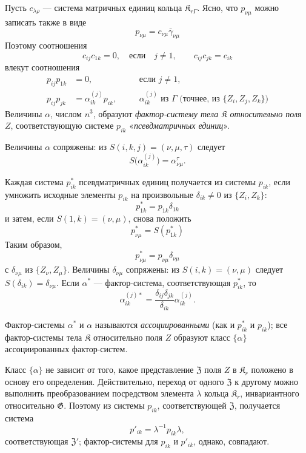 \documentclass[11pt]{article}
\begin{document}
Пусть \(c_{\lambda\rho}\) --- система матричных единиц кольца \(\mathfrak K_{r\Gamma}\). Ясно, что \(p_{\nu\mu}\) можно записать также в виде
\[
p_{\nu\mu}=c_{\nu\mu}\bar\gamma_{\nu\mu}
\]
Поэтому соотношения
\[
c_{ij}c_{1k}=0,\quad\text{если}\quad j\ne1,
\qquad
c_{ij}c_{jk}=c_{ik}
\]
влекут соотношения
\[
\begin{aligned}
p_{ij}p_{1k}&=0,\quad &&\text{если }j\ne1,\\
p_{ij}p_{jk}&=\alpha_{ik}^{(j)}p_{ik},\quad
&&\alpha_{ik}^{(j)}\text{ из }\Gamma\text{ (точнее, из }\{Z_i,Z_j,Z_k\}\text{)}
\end{aligned}
\]
Величины \(\alpha\), числом \(n^3\), образуют \emph{фактор-систему тела \(\mathfrak K\) относительно поля \(Z\)}, соответствующую системе \(p_{ik}\) «\emph{псевдматричных единиц}».

Величины \(\alpha\) сопряжены: из \(S(i,k,j)=(\nu,\mu,\tau)\) следует
\[
S\bigl(\alpha_{ik}^{(j)}\bigr)=\alpha_{\nu\mu}^{\tau}.
\]

Каждая система \(p_{ik}^*\) псевдматричных единиц получается из системы \(p_{ik}\), если умножить исходные элементы \(p_{ik}\) на произвольные \(\delta_{ik}\ne0\) из \(\{Z_i,Z_k\}\):
\[
p_{1k}^*=p_{1k}\delta_{1k}
\]
и затем, если \(S(1,k)=(\nu,\mu)\), снова положить
\[
p_{\nu\mu}^*=S(p_{1k}^*)
\]
Таким образом,
\[
p_{\nu\mu}^*=p_{\nu\mu}\delta_{\nu\mu}
\]
с \(\delta_{\nu\mu}\) из \(\{Z_\nu,Z_\mu\}\). Величины \(\delta_{\nu\mu}\) сопряжены: из \(S(i,k)=(\nu,\mu)\) следует \(S(\delta_{ik})=\delta_{\nu\mu}\). Если \(\alpha^*\) --- фактор-система, соответствующая \(p_{ik}^*\), то
\[
\alpha_{ik}^{(j)*}=\frac{\delta_{ij}\delta_{jk}}{\delta_{ik}}\alpha_{ik}^{(j)}.
\]

Фактор-системы \(\alpha^*\) и \(\alpha\) называются \emph{ассоциированными} (как и \(p_{ik}^*\) и \(p_{ik}\)); все фактор-системы тела \(\mathfrak K\) относительно поля \(Z\) образуют класс \(\{\alpha\}\) ассоциированных фактор-систем.

Класс \(\{\alpha\}\) не зависит от того, какое представление \(\mathfrak Z\) поля \(Z\) в \(\mathfrak K_r\) положено в основу его определения. Действительно, переход от одного \(\mathfrak Z\) к другому можно выполнить преобразованием посредством элемента \(\lambda\) кольца \(\mathfrak K_r\), инвариантного относительно \(\mathfrak G\). Поэтому из системы \(p_{ik}\), соответствующей \(\mathfrak Z\), получается система
\[
p'_{ik}=\lambda^{-1}p_{ik}\lambda,
\]
соответствующая \(\mathfrak Z'\); фактор-системы для \(p_{ik}\) и \(p'_{ik}\), однако, совпадают.
\end{document}

